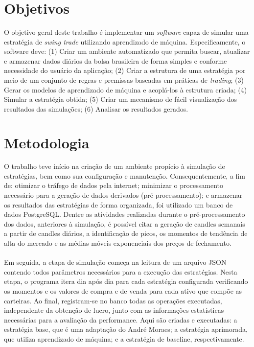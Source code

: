 \section{Objetivos}

\paragraph{} O objetivo geral deste trabalho é implementar um \textit{software} capaz de simular uma estratégia de \textit{swing trade} utilizando aprendizado de máquina. Especificamente, o software deve: (1) Criar um ambiente automatizado que permita buscar, atualizar e armazenar dados diários da bolsa brasileira de forma simples e conforme necessidade do usuário da aplicação; (2) Criar a estrutura de uma estratégia por meio de um conjunto de regras e premissas baseadas em práticas de \textit{trading}; (3) Gerar os modelos de aprendizado de máquina e acoplá-los à estrutura criada; (4) Simular a estratégia obtida; (5) Criar um mecanismo de fácil visualização dos resultados das simulações; (6) Analisar os resultados gerados.




\section{Metodologia}

\paragraph{} O trabalho teve início na criação de um ambiente propício à simulação de estratégias, bem como sua configuração e manutenção. Consequentemente, a fim de: otimizar o tráfego de dados pela internet; minimizar o processamento necessário para a geração de dados derivados (pré-processamento); e armazenar os resultados das estratégias de forma organizada, foi utilizado um banco de dados PostgreSQL. Dentre as atividades realizadas durante o pré-processamento dos dados, anteriores à simulação, é possível citar a geração de candles semanais a partir de candles diários, a identificação de picos, os momentos de tendência de alta do mercado e as médias móveis exponenciais dos preços de fechamento.

\paragraph{} Em seguida, a etapa de simulação começa na leitura de um arquivo JSON contendo todos parâmetros necessários para a execução das estratégias. Nesta etapa, o programa itera dia após dia para cada estratégia configurada verificando os momentos e os valores de compra e de venda para cada ativo que compõe as carteiras. Ao final, registram-se no banco todas as operações executadas, independente da obtenção de lucro, junto com as informações estatísticas necessárias para a avaliação da performance. Aqui são criadas e executadas: a estratégia base, que é uma adaptação do André Moraes; a estratégia aprimorada, que utiliza aprendizado de máquina; e a estratégia de baseline, respectivamente.

